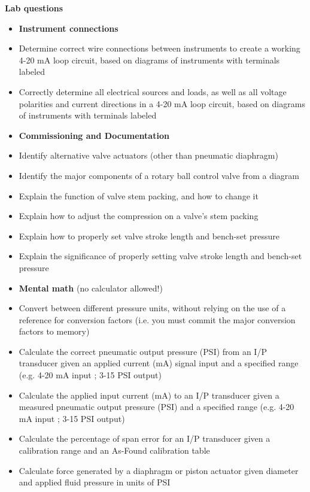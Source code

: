 \documentclass[12pt,a4paper]{article}
\begin{document}
\begin{itemize}
\vskip 10pt

\vfil \eject

\noindent
{\bf Lab questions}

\begin{itemize}
\item{} {\bf Instrument connections}
\item{} Determine correct wire connections between instruments to create a working 4-20 mA loop circuit, based on diagrams of instruments with terminals labeled
\item{} Correctly determine all electrical sources and loads, as well as all voltage polarities and current directions in a 4-20 mA loop circuit, based on diagrams of instruments with terminals labeled
\end{itemize}

\filbreak

\begin{itemize}
\item{} {\bf Commissioning and Documentation}
\item{} Identify alternative valve actuators (other than pneumatic diaphragm)
\item{} Identify the major components of a rotary ball control valve from a diagram
\item{} Explain the function of valve stem packing, and how to change it
\item{} Explain how to adjust the compression on a valve's stem packing
\item{} Explain how to properly set valve stroke length and bench-set pressure
\item{} Explain the significance of properly setting valve stroke length and bench-set pressure
\end{itemize}

\filbreak

\begin{itemize}
\item{} {\bf Mental math} (no calculator allowed!)
\item{} Convert between different pressure units, without relying on the use of a reference for conversion factors (i.e. you must commit the major conversion factors to memory)
\item{} Calculate the correct pneumatic output pressure (PSI) from an I/P transducer given an applied current (mA) signal input and a specified range (e.g. 4-20 mA input ; 3-15 PSI output)
\item{} Calculate the applied input current (mA) to an I/P transducer given a measured pneumatic output pressure (PSI) and a specified range (e.g. 4-20 mA input ; 3-15 PSI output) 
\item{} Calculate the percentage of span error for an I/P transducer given a calibration range and an As-Found calibration table 
\item{} Calculate force generated by a diaphragm or piston actuator given diameter and applied fluid pressure in units of PSI
\end{itemize}


\end{itemize}
\end{document}
